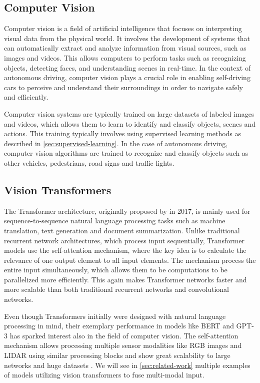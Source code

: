 \subsection{Computer Vision}
Computer vision is a field of artificial intelligence that focuses on interpreting visual data from the physical world. It involves the development of systems that can automatically extract and analyze information from visual sources, such as images and videos. This allows computers to perform tasks such as recognizing objects, detecting faces, and understanding scenes in real-time. In the context of autonomous driving, computer vision plays a crucial role in enabling self-driving cars to perceive and understand their surroundings in order to navigate safely and efficiently.

Computer vision systems are typically trained on large datasets of labeled images and videos, which allows them to learn to identify and classify objects, scenes and actions. This training typically involves using supervised learning methods as described in \cref{sec:supervised-learning}. In the case of autonomous driving, computer vision algorithms are trained to recognize and classify objects such as other vehicles, pedestrians, road signs and traffic lights.

\subsection{Vision Transformers}
The Transformer architecture, originally proposed by \textcite{attention-is-all-you-need} in 2017, is mainly used for sequence-to-sequence natural language processing tasks such as machine translation, text generation and document summarization. Unlike traditional recurrent network architectures, which process input sequentially, Transformer models use the self-attention mechanism, where the key idea is to calculate the relevance of one output element to all input elements.  The mechanism process the entire input simultaneously, which allows them to be computations to be parallelized more efficiently. This again makes Transformer networks faster and more scalable than both traditional recurrent networks and convolutional networks. 

Even though Transformers initially were designed with natural language processing in mind, their exemplary performance in models like BERT \cite{bert} and GPT-3 \cite{gpt-3} has sparked interest also in the field of computer vision. The self-attention mechanism allows processing multiple sensor modalities like RGB images and LIDAR using similar processing blocks and show great scalability to large networks and huge datasets \cite{transformers-in-vision-survey}. We will see in \cref{sec:related-work} multiple examples of models utilizing vision transformers to fuse multi-modal input. %

